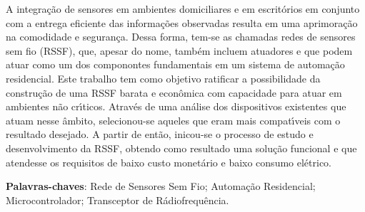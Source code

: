 \begin{resumo}

A integração de sensores em ambientes domiciliares e em escritórios em conjunto com a entrega eficiente das
informações observadas resulta em uma aprimoração na comodidade e segurança. Dessa forma, tem-se as chamadas
redes de sensores sem fio (RSSF), que, apesar do nome, também incluem atuadores e que podem atuar como um dos
componontes fundamentais em um sistema de automação residencial. Este trabalho tem como objetivo ratificar a
possibilidade da construção de uma RSSF barata e econômica com capacidade para atuar em ambientes não
crı́ticos. Através de uma análise dos dispositivos existentes que atuam nesse âmbito, selecionou-se aqueles que
eram mais compatı́veis com o resultado desejado. A partir de então, inicou-se o processo de estudo e
desenvolvimento da RSSF, obtendo como resultado uma solução funcional e que atendesse os requisitos de baixo
custo monetário e baixo consumo elétrico.

\vspace{\onelineskip}
\noindent
\textbf{Palavras-chaves}: Rede de Sensores Sem Fio; Automação Residencial; Microcontrolador; Transceptor de
Rádiofrequência.
\end{resumo}
